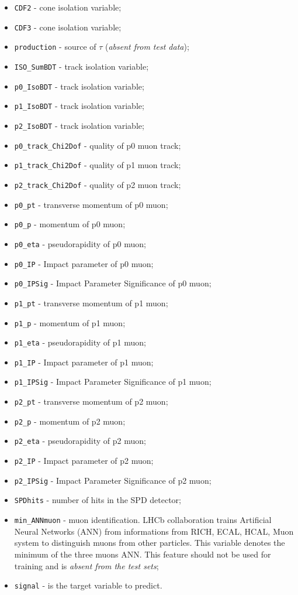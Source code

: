 \documentclass[conference]{IEEEtran}
\begin{document}
\begin{itemize}
	\item \texttt{CDF2} - cone isolation variable;
	\item \texttt{CDF3} - cone isolation variable;
	\item \texttt{production} - source of $\tau$ (\textit{absent from test data});
	\item \texttt{ISO\_SumBDT} - track isolation variable;
	\item \texttt{p0\_IsoBDT} - track isolation variable;
	\item \texttt{p1\_IsoBDT} - track isolation variable;
	\item \texttt{p2\_IsoBDT} - track isolation variable;
	\item \texttt{p0\_track\_Chi2Dof} - quality of p0 muon track;
	\item \texttt{p1\_track\_Chi2Dof} - quality of p1 muon track;
	\item \texttt{p2\_track\_Chi2Dof} - quality of p2 muon track;
	\item \texttt{p0\_pt} - transverse momentum of p0 muon;
	\item \texttt{p0\_p} - momentum of p0 muon;
	\item \texttt{p0\_eta} - pseudorapidity of p0 muon;
	\item \texttt{p0\_IP} - Impact parameter of p0 muon;
	\item \texttt{p0\_IPSig} - Impact Parameter Significance of p0 muon;
	\item \texttt{p1\_pt} - transverse momentum of p1 muon;
	\item \texttt{p1\_p} - momentum of p1 muon;
	\item \texttt{p1\_eta} - pseudorapidity of p1 muon;
	\item \texttt{p1\_IP} - Impact parameter of p1 muon;
	\item \texttt{p1\_IPSig} - Impact Parameter Significance of p1 muon;
	\item \texttt{p2\_pt} - transverse momentum of p2 muon;
	\item \texttt{p2\_p} - momentum of p2 muon;
	\item \texttt{p2\_eta} - pseudorapidity of p2 muon;
	\item \texttt{p2\_IP} - Impact parameter of p2 muon;
	\item \texttt{p2\_IPSig} - Impact Parameter Significance of p2 muon;
	\item \texttt{SPDhits} - number of hits in the SPD detector;
	\item \texttt{min\_ANNmuon} - muon identification. LHCb collaboration trains
	Artificial Neural Networks (ANN) from informations from RICH, ECAL,
	HCAL, Muon system to distinguish muons from other particles. This
	variable denotes the minimum of the three muons ANN. This feature
	should not be used for training and is \textit{absent from the test
		sets};
	\item \texttt{signal} - is the target variable to predict.
\end{itemize}
\end{document}
